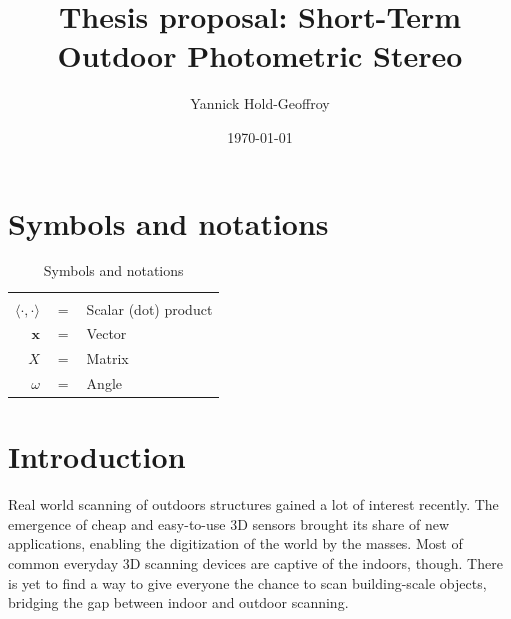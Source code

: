 \documentclass{report}
\title{Thesis proposal: Short-Term Outdoor Photometric Stereo}
\author{Yannick Hold-Geoffroy}
\date{\today}
\begin{document}

\maketitle

\tableofcontents

\newcommand{\boldomega}{\boldsymbol \omega} %
\newcommand{\boldmu}{\boldsymbol \mu} %
\newcommand{\bolddelta}{\boldsymbol \delta} %

\newcommand\norm[1]{\left\lVert#1\right\rVert}

\newcommand\todo[1]{\textcolor{red}{#1}}

\graphicspath{{figures/}}


\chapter*{Symbols and notations}

\begin{table}[htbp]\caption{Symbols and notations}
\centering %
\begin{tabular}{r c p{10cm} }

\hline & & \\
$\langle \cdot, \cdot \rangle$      & $=$ & Scalar (dot) product \\
$\mathbf{x}$                        & $=$ & Vector \\
$X$                                 & $=$ & Matrix \\
$\omega$                            & $=$ & Angle \\
\hline
\end{tabular}
\label{tab:TableOfNotationForMyResearch}
\end{table}


\chapter{Introduction}

Real world scanning of outdoors structures gained a lot of interest recently. The emergence of cheap and easy-to-use 3D sensors brought its share of new applications, enabling the digitization of the world by the masses. Most of common everyday 3D scanning devices are captive of the indoors, though. There is yet to find a way to give everyone the chance to scan building-scale objects, bridging the gap between indoor and outdoor scanning.
\end{document}

